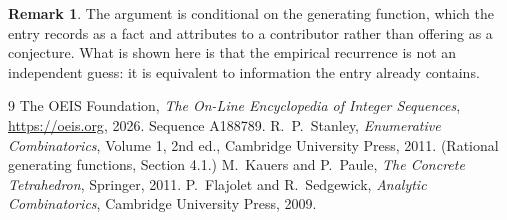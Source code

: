 \documentclass[11pt,a4paper]{article}
\theoremstyle{plain}
\theoremstyle{definition}
\newtheorem{remark}[theorem]{Remark}
\begin{document}
\begin{remark}
The argument is conditional on the generating function, which the entry records as a fact and
attributes to a contributor rather than offering as a conjecture. What is shown here is that
the empirical recurrence is not an independent guess: it is equivalent to information the
entry already contains.
\end{remark}

\begin{thebibliography}{9}
 The OEIS Foundation, \emph{The On-Line Encyclopedia of Integer
Sequences}, \url{https://oeis.org}, 2026. Sequence A188789.
 R.~P.~Stanley, \emph{Enumerative Combinatorics}, Volume 1, 2nd ed.,
Cambridge University Press, 2011. (Rational generating functions, Section 4.1.)
 M.~Kauers and P.~Paule, \emph{The Concrete Tetrahedron}, Springer, 2011.
 P.~Flajolet and R.~Sedgewick, \emph{Analytic Combinatorics}, Cambridge
University Press, 2009.
\end{thebibliography}
\end{document}
